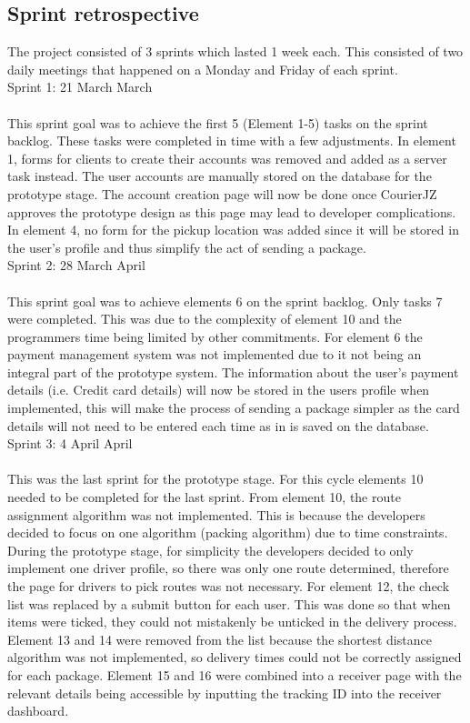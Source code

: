 \documentclass[paper=a4, fontsize=11pt]{scrartcl} %
\numberwithin{equation}{section} %
\numberwithin{figure}{section} %
\numberwithin{table}{section} %
\begin{document}
\subsection{Sprint retrospective}

The project consisted of 3 sprints which lasted 1 week each. This consisted of two daily meetings that happened on a Monday and Friday of each sprint. \\

Sprint 1: 21 March  March\\\\
This sprint goal was to achieve the first 5 (Element 1-5) tasks on the sprint backlog.  These tasks were completed in time with a few adjustments. In element 1, forms for clients to create their accounts was removed and added as a server task instead. The user accounts are manually stored on the database for the prototype stage. The account creation page will now be done once CourierJZ approves the prototype design as this page may lead to developer complications.  In element 4, no form for the pickup location was added since it will be stored in the user's profile and thus simplify the act of sending a package.\\

Sprint 2: 28 March  April\\\\
This sprint goal was to achieve elements 6 on the sprint backlog. Only tasks 7 were completed. This was due to the complexity of element 10 and the programmers time being limited by other commitments. For element 6 the payment management system was not implemented due to it not being an integral part of the prototype system. The information about the user's payment details (i.e. Credit card details) will now be stored in the users profile when implemented, this will make the process of sending a package simpler as the card details will not need to be entered each time as in is saved on the database.\\

Sprint 3: 4 April  April\\\\
This was the last sprint for the prototype stage. For this cycle elements 10 needed to be completed for the last sprint. From element 10, the route assignment algorithm was not implemented. This is because the developers decided to focus on one algorithm (packing algorithm) due to time constraints. During the prototype stage, for simplicity the developers decided to only implement one driver profile, so there was only one route determined, therefore the page for drivers to pick routes was not necessary. For element 12, the check list was replaced by a submit button for each user. This was done so that when items were ticked, they could not mistakenly be unticked in the delivery process. Element 13 and 14 were removed from the list because the shortest distance algorithm was not implemented, so delivery times could not be correctly assigned for each package. Element 15 and 16 were combined into a receiver page with the relevant details being accessible by inputting the tracking ID into the receiver dashboard.\\
\end{document}
